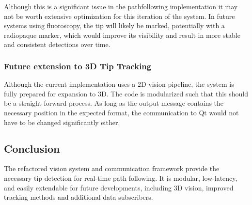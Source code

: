 Although this is a significant issue in the pathfollowing implementation it may not be worth extensive optimization for this iteration of the system. In future systems using fluoroscopy, the tip will likely be marked, potentially with a radiopaque marker, which would improve its visibility and result in more stable and consistent detections over time.

\subsubsection{Future extension to 3D Tip Tracking}
Although the current implementation uses a 2D vision pipeline, the system is fully prepared for expansion to 3D. The code is modularized such that this should be a straight forward process. As long as the output message contains the necessary position in the expected format, the communication to Qt would not have to be changed significantly either.

\subsection{Conclusion}
The refactored vision system and communication framework provide the necessary tip detection for real-time path following. It is modular, low-latency, and easily extendable for future developments, including 3D vision, improved tracking methods and additional data subscribers.


